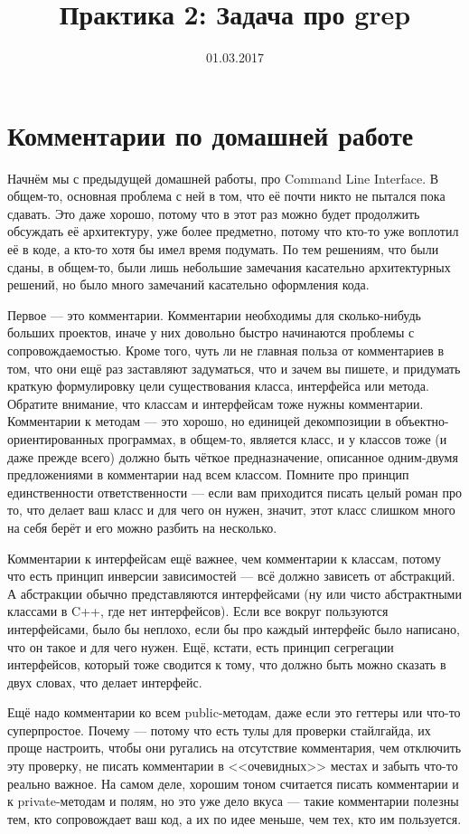 \documentclass[a5paper]{article}
\title{Практика 2: Задача про grep}
\date{01.03.2017}
\begin{document}
\maketitle
\thispagestyle{empty}

\section{Комментарии по домашней работе}

Начнём мы с предыдущей домашней работы, про Command Line Interface. В общем-то, основная проблема с ней в том, что её почти никто не пытался пока сдавать. Это даже хорошо, потому что в этот раз можно будет продолжить обсуждать её архитектуру, уже более предметно, потому что кто-то уже воплотил её в коде, а кто-то хотя бы имел время подумать. По тем решениям, что были сданы, в общем-то, были лишь небольшие замечания касательно архитектурных решений, но было много замечаний касательно оформления кода. 

Первое --- это комментарии. Комментарии необходимы для сколько-нибудь больших проектов, иначе у них довольно быстро начинаются проблемы с сопровождаемостью. Кроме того, чуть ли не главная польза от комментариев в том, что они ещё раз заставляют задуматься, что и зачем вы пишете, и придумать краткую формулировку цели существования класса, интерфейса или метода. Обратите внимание, что классам и интерфейсам тоже нужны комментарии. Комментарии к методам --- это хорошо, но единицей декомпозиции в объектно-ориентированных программах, в общем-то, является класс, и у классов тоже (и даже прежде всего) должно быть чёткое предназначение, описанное одним-двумя предложениями в комментарии над всем классом. Помните про принцип единственности ответственности --- если вам приходится писать целый роман про то, что делает ваш класс и для чего он нужен, значит, этот класс слишком много на себя берёт и его можно разбить на несколько.

Комментарии к интерфейсам ещё важнее, чем комментарии к классам, потому что есть принцип инверсии зависимостей --- всё должно зависеть от абстракций. А абстракции обычно представляются интерфейсами (ну или чисто абстрактными классами в C++, где нет интерфейсов). Если все вокруг пользуются интерфейсами, было бы неплохо, если бы про каждый интерфейс было написано, что он такое и для чего нужен. Ещё, кстати, есть принцип сегрегации интерфейсов, который тоже сводится к тому, что должно быть можно сказать в двух словах, что делает интерфейс.

Ещё надо комментарии ко всем public-методам, даже если это геттеры или что-то суперпростое. Почему --- потому что есть тулы для проверки стайлгайда, их проще настроить, чтобы они ругались на отсутствие комментария, чем отключить эту проверку, не писать комментарии в <<очевидных>> местах и забыть что-то реально важное. На самом деле, хорошим тоном считается писать комментарии и к private-методам и полям, но это уже дело вкуса --- такие комментарии полезны тем, кто сопровождает ваш код, а их по идее меньше, чем тех, кто им пользуется.
\end{document}
